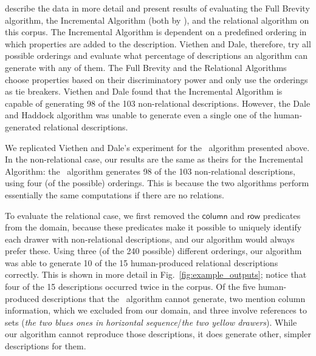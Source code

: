  describe the data in
more detail and present results of evaluating the Full Brevity
algorithm, the Incremental Algorithm (both by ), and
the relational algorithm \cite{dale91:_gener_refer_expres_invol_relat}
on this corpus. The Incremental Algorithm is dependent on a predefined
ordering in which properties are added to the description. Viethen and
Dale, therefore, try all possible orderings and evaluate what
percentage of descriptions an algorithm can generate with any of
them. The Full Brevity and the Relational Algorithms choose properties
based on their discriminatory power and only use the orderings as tie
breakers. Viethen and Dale found that the Incremental Algorithm is
capable of generating 98 of the 103 non-relational
descriptions. However, the Dale and Haddock algorithm was unable to
generate even a single one of the human-generated relational
descriptions.




We replicated Viethen and Dale's experiment for the \el\ algorithm
presented above. In the non-relational case, our results are the same
as theirs for the Incremental Algorithm: the \el\ algorithm generates
98 of the 103 non-relational descriptions, using four (of the
possible) orderings.  This is because the two algorithms perform
essentially the same computations if there are no relations.


To evaluate the relational case, we first removed the
$\mathsf{column}$ and $\mathsf{row}$ predicates from the domain,
because these predicates make it possible to uniquely identify each
drawer with non-relational descriptions, and our algorithm would
always prefer these.  Using three (of the 240 possible) different
orderings, our algorithm was able to generate 10 of the 15
human-produced relational descriptions correctly.  This is shown in
more detail in Fig.~\ref{fig:example_outputs}; notice that four of the
15 descriptions occurred twice in the corpus.  Of the five
human-produced descriptions that the \el\ algorithm cannot generate,
two mention column information, which we excluded from our domain, and
three involve references to sets (\textit{the two blues ones in
  horizontal sequence}/\textit{the two yellow drawers}). While our
algorithm cannot reproduce those descriptions, it does generate other,
simpler descriptions for them.








